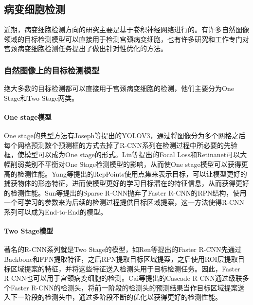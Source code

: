 \subsection{病变细胞检测}
\par 近期，病变细胞检测方向的研究主要是基于卷积神经网络进行的。有许多自然图像领域的目标检测模型可以直接用于检测宫颈病变细胞，也有许多研究和工作专门对宫颈病变细胞检测任务提出了做出针对性优化的方法。
\subsubsection{自然图像上的目标检测模型}
\par 绝大多数的目标检测都可以直接用于宫颈病变细胞的检测，他们主要分为One Stage和Two Stage两类。
\paragraph{One stage模型}
\par One stage的典型方法有Joseph\cite{Joseph2018YOLOv3}等提出的YOLOV3，通过将图像分为多个网格之后每个网格预测数个预测框的方式去掉了R-CNN系列在检测过程中所必要的先验框，使模型可以成为One stage的形式。Lin\cite{lin2018focal}等提出的Focal Loss和Retinanet可以大幅削弱类别不平衡对One Stage检测模型的影响，从而使One stage模型可以获得更高的检测性能。Yang\cite{yang2019reppoints}等提出的RepPoints使用点集来表示目标，可以让模型更好的捕获物体的形态特征，进而使模型更好的学习目标潜在的特征信息，从而获得更好的检测性能。Sun\cite{sun2021sparse}等提出的Sparse R-CNN抛弃了Faster R-CNN的RPN结构，使用一个可学习的参数来为后续的检测过程提供目标区域提案，这一方法使得R-CNN系列可以成为End-to-End的模型。
\paragraph{Two Stage模型}
\par 著名的R-CNN系列就是Two Stage的模型，如Ren\cite{ren2015faster}等提出的Faster R-CNN先通过Backbone和FPN提取特征，之后RPN提取目标区域提案，之后使用ROI层提取目标区域提案的特征，并将这些特征送入检测头用于目标检测任务。因此，Faster R-CNN也可以用于宫颈病变细胞的检测。Cai\cite{cai2017cascade}等提出的Cascade R-CNN通过级联多个Faster R-CNN的检测头，将前一阶段的检测头的预测结果当作目标区域提案送入下一阶段的检测头中，通过多阶段不断的优化以获得更好的检测性能。
